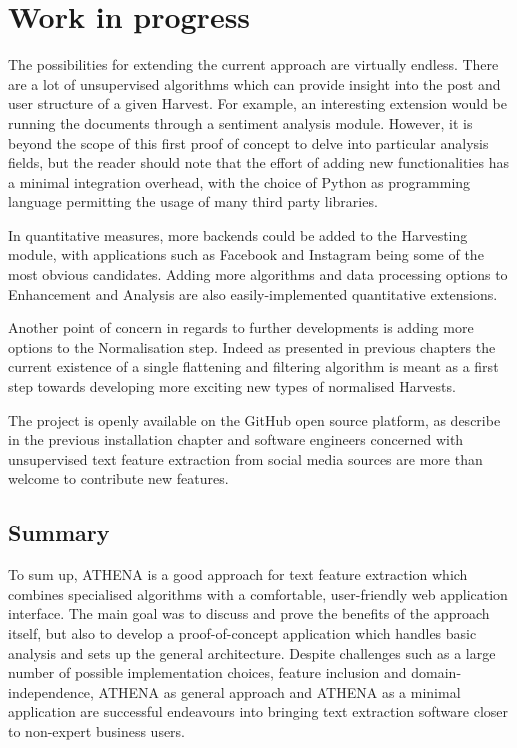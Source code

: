 \documentclass[12pt,a4paper,twoside]{report}
\begin{document}
\section{Work in progress}
The possibilities for extending the current approach are virtually endless. There are a lot of unsupervised algorithms which can provide insight into the post and user structure of a given Harvest. For example, an interesting extension would be running the documents through a sentiment analysis module. However, it is beyond the scope of this first proof of concept to delve into particular analysis fields, but the reader should note that the effort of adding new functionalities has a minimal integration overhead, with the choice of Python as programming language permitting the usage of many third party libraries.

In quantitative measures, more backends could be added to the Harvesting module, with applications such as Facebook and Instagram being some of the most obvious candidates. Adding more algorithms and data processing options to Enhancement and Analysis are also easily-implemented quantitative extensions.

Another point of concern in regards to further developments is adding more options to the Normalisation step. Indeed as presented in previous chapters the current existence of a single flattening and filtering algorithm is meant as a first step towards developing more exciting new types of normalised Harvests.

The project is openly available on the GitHub open source platform, as describe in the previous installation chapter and software engineers concerned with unsupervised text feature extraction from social media sources are more than welcome to contribute new features.

\subsection*{Summary}
To sum up, ATHENA is a good approach for text feature extraction which combines specialised algorithms with a comfortable, user-friendly web application interface. The main goal was to discuss and prove the benefits of the approach itself, but also to develop a proof-of-concept application which handles basic analysis and sets up the general architecture. Despite challenges such as a large number of possible implementation choices, feature inclusion and domain-independence, ATHENA as general approach and ATHENA as a minimal application are successful endeavours into bringing text extraction software closer to non-expert business users.

 


\end{document}
